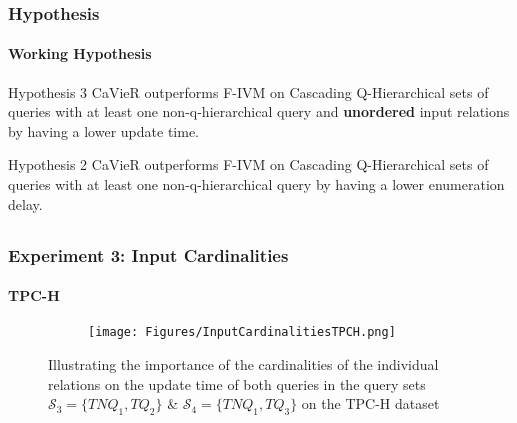 \documentclass[
	11pt, %
]{beamer}
\begin{document}
\begin{frame}
	\frametitle{Hypothesis}
	\framesubtitle{Working Hypothesis}
	\begin{block}{Hypothesis 3}
			CaVieR outperforms F-IVM on Cascading Q-Hierarchical sets of queries with at least one non-q-hierarchical query and \textbf{unordered} input relations by having a lower update time.
	\end{block}
		\begin{block}{Hypothesis 2}
		CaVieR outperforms F-IVM on Cascading Q-Hierarchical sets of queries with at least one non-q-hierarchical query by having a lower enumeration delay.
	\end{block}
	
\end{frame}

\subsection{}
\begin{frame}
	\frametitle{Experiment 3: Input Cardinalities}
	\framesubtitle{TPC-H}
	\begin{figure}

		\begin{minipage}{0.25\textwidth}
		\end{minipage}
		\begin{minipage}{0.74\textwidth}
			\begin{figure}
				\centering
				\texttt{[image: Figures/InputCardinalitiesTPCH.png]}
			\end{figure}
		\end{minipage}
	\caption{Illustrating the importance of the cardinalities of the individual relations on the update time of both queries in the query sets $\mathcal{S}_3 = \{TNQ_1, TQ_2\}$ \& $\mathcal{S}_4 = \{TNQ_1, TQ_3\}$ on the TPC-H dataset}
\label{fig:inputCardinalitiesTpch}
	\end{figure}
\end{frame}
\end{document}
